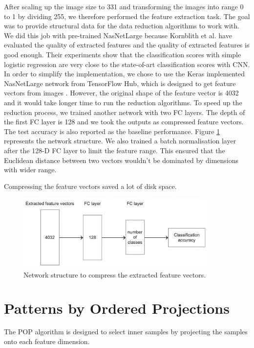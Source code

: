 After scaling up the image size to 331 and transforming the images into range 0 to 1 by dividing 255, we therefore performed the feature extraction task. The goal was to provide structural data for the data reduction algorithms to work with. We did this job with pre-trained NasNetLarge \cite{Zoph2018} because Kornblith et al. \cite{Kornblith2018} have evaluated the quality of extracted features and the quality of extracted features is good enough. Their experiments show that the classification scores with simple logistic regression are very close to the state-of-art classification scores with CNN. In order to simplify the implementation, we chose to use the Keras implemented NasNetLarge network from TensorFlow Hub, which is designed to get feature vectors from images \cite{tensorhub_nasnet}. However, the original shape of the feature vector is 4032 and it would take longer time to run the reduction algorithms. To speed up the reduction process, we trained another network with two FC layers. The depth of the first FC layer is 128 and we took the outputs as compressed feature vectors. The test accuracy is also reported as the baseline performance. Figure \ref{Fig.compress_layer} represents the network structure. We also trained a batch normalisation layer after the 128-D FC layer to limit the feature range. This ensured that the Euclidean distance between two vectors wouldn't be dominated by dimensions with wider range.

Compressing the feature vectors saved a lot of disk space. 


 \begin{figure}[H]
 \centering
 \includegraphics[width=0.9\textwidth]{src/compress_layer.png}
 \caption{Network structure to compress the extracted feature vectors.}
 \label{Fig.compress_layer}
 \end{figure}

\section{Patterns by Ordered Projections}
The POP algorithm is designed to select inner samples by projecting the samples onto each feature dimension.


